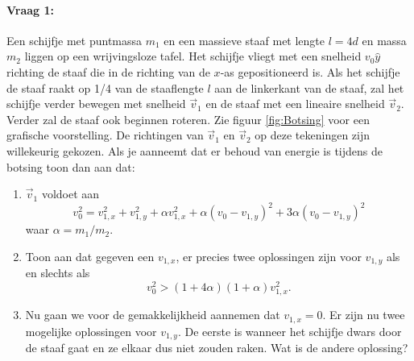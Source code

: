 \documentclass[11pt]{article}
\begin{document}
\paragraph{Vraag 1:}
Een schijfje met puntmassa $m_1$ en een massieve staaf met lengte $l=4d$ en massa $m_2$ liggen op een wrijvingsloze tafel.  Het schijfje vliegt met een snelheid $v_0 \hat{y}$ richting de staaf die in de richting van de $x$-as gepositioneerd is. Als het schijfje de staaf raakt op 1/4 van de staaflengte $l$ aan de linkerkant van de staaf, zal het schijfje verder bewegen met snelheid $\vec{v}_1$ en de staaf met een lineaire snelheid $\vec{v}_2$. Verder zal de staaf ook beginnen roteren. Zie figuur \ref{fig:Botsing} voor een grafische voorstelling. De richtingen van $\vec v_1$ en $\vec v_2$ op deze tekeningen zijn willekeurig gekozen. Als je aanneemt dat er behoud van energie is tijdens de botsing toon dan aan dat:
\begin{enumerate}
	\item $\vec{v}_1$ voldoet aan
	\begin{equation}
		v_0^2=v_{1,x}^2+v_{1,y}^2+\alpha v_{1,x}^2+\alpha(v_0-v_{1,y})^2+3\alpha(v_0-v_{1,y})^2
	\end{equation}
	waar $\alpha=m_1/m_2$.
	\item Toon aan dat gegeven een $v_{1,x}$, er precies twee oplossingen zijn voor $v_{1,y}$ als en slechts als
	\begin{equation}
		v_0^2>(1+4\alpha)(1+\alpha)v_{1,x}^2.
	\end{equation}
	\item Nu gaan we voor de gemakkelijkheid aannemen dat $v_{1,x}=0$. Er zijn nu twee mogelijke oplossingen voor $v_{1,y}$. De eerste is wanneer het schijfje dwars door de staaf gaat en ze elkaar dus niet zouden raken. Wat is de andere oplossing?
\end{enumerate}
\end{document}
